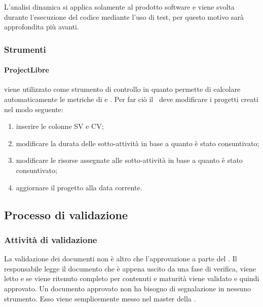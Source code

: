 \documentclass[12pt,a4paper]{article}
\begin{document}
L’analisi dinamica si applica solamente al prodotto software e viene svolta durante l’esecuzione del codice mediante l’uso di test, per questo motivo sarà approfondita più avanti.

\subsubsection{Strumenti}

\paragraph{ProjectLibre}
 viene utilizzato come strumento di controllo in quanto permette di calcolare automaticamente le metriche di  e . Per far ciò il \RE\ deve modificare i progetti creati nel modo seguente:
\begin{enumerate}
	\item inserire le colonne SV e CV;
	\item modificare la durata delle sotto-attività in base a quanto è stato consuntivato;
	\item modificare le risorse assegnate alle sotto-attività in base a quanto è stato consuntivato;
	\item aggiornare il progetto alla data corrente.
\end{enumerate}

\subsection{Processo di validazione}

\subsubsection{Attività di validazione}

La validazione dei documenti non è altro che l'approvazione a parte del \RE. Il responsabile legge il documento che è appena uscito da una fase di verifica, viene letto e se viene ritenuto completo per contenuti e maturità viene validato e quindi approvato. Un documento approvato non ha bisogno di segnalazione in nessuno strumento. Esso viene semplicemente messo nel  master della .
\end{document}

